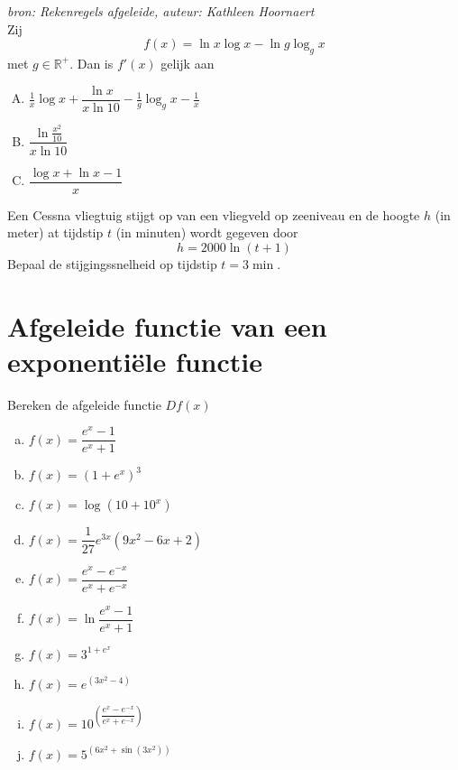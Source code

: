 \documentclass[a4paper,12pt]{article}
\begin{document}
\begin{oefening}
{\em \scriptsize bron: Rekenregels afgeleide, auteur: Kathleen Hoornaert}\\
Zij
$$f(x)=\ln x \log x - \ln g \log_g x$$
met $g\in \mathbb{R}^+$. Dan is $f'(x)$ gelijk aan
\begin{enumerate}[(A)]
  \itemsep.8em
  \item $\frac{1}{x} \log x + \dfrac{\ln x}{x \ln 10} - \frac{1}{g}\log_g x - \frac{1}{x}$
  \item $\dfrac{\ln \frac{x^2}{10}}{x \ln 10}$
  \item $\dfrac{\log x + \ln x - 1}{x}$
\end{enumerate}
\end{oefening}

\begin{oefening}
Een Cessna vliegtuig stijgt op van een vliegveld op zeeniveau en de hoogte $h$ (in meter) at tijdstip $t$ (in minuten) wordt gegeven door
$$h=2000 \ln(t+1)$$
Bepaal de stijgingssnelheid op tijdstip $t=3\min$.
\end{oefening}
\vspace*{-1cm}

\pagebreak
\section{Afgeleide functie van een exponentiële functie}

\begin{oefening}
Bereken de afgeleide functie $Df(x)$
\begin{multicols}{2}
\begin{enumerate}[(a)]
  \itemsep0.8em
  \item $f(x)=\dfrac{e^x-1}{e^x+1}$
  \item $f(x)=(1+e^x)^3$
  \item $f(x)=\log(10+10^x)$
  \item $f(x)=\dfrac{1}{27}e^{3x}(9x^2-6x+2)$
  \item $f(x)=\dfrac{e^x-e^{-x}}{e^x+e^{-x}}$
  \item $f(x)=\ln\dfrac{e^x-1}{e^x+1}$
  \item $f(x)=3^{1+e^x}$
  \item $f(x)=e^{(3x^2-4)}$
  \item $f(x)=10^{\left(\dfrac{e^x-e^{-x}}{e^x+e^{-x}}\right)}$
  \item $f(x)=5^{\left(6x^2+\sin(3x^2)\right)}$
\end{enumerate}
\end{multicols}
\end{oefening}
\end{document}
